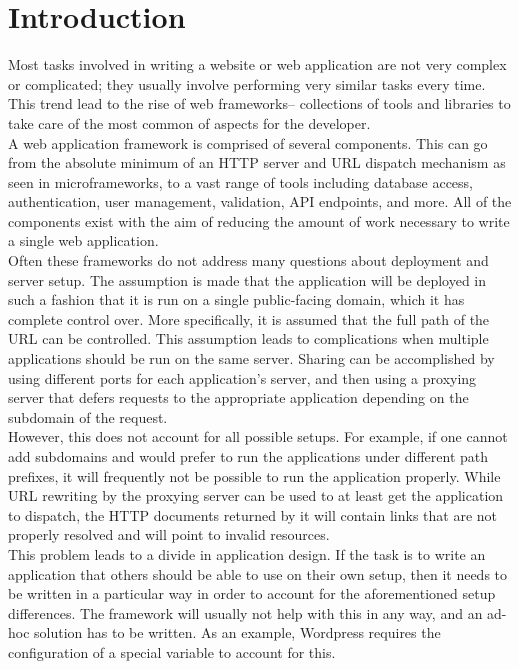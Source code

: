 \documentclass{sig-alternate}
\begin{document}
\printccsdesc


\section{Introduction}
Most tasks involved in writing a website or web application are not very complex or complicated; they usually involve performing very similar tasks every time. This trend lead to the rise of web frameworks-- collections of tools and libraries to take care of the most common of aspects for the developer. \\

A web application framework is comprised of several components. This can go from the absolute minimum of an HTTP server and URL dispatch mechanism as seen in microframeworks\cite{microframeworks}, to a vast range of tools including database access, authentication, user management, validation, API endpoints, and more. All of the components exist with the aim of reducing the amount of work necessary to write a single web application. \\

Often these frameworks do not address many questions about deployment and server setup. The assumption is made that the application will be deployed in such a fashion that it is run on a single public-facing domain, which it has complete control over. More specifically, it is assumed that the full path of the URL can be controlled. This assumption leads to complications when multiple applications should be run on the same server. Sharing can be accomplished by using different ports for each application's server, and then using a proxying server that defers requests to the appropriate application depending on the subdomain of the request. \\

However, this does not account for all possible setups. For example, if one cannot add subdomains and would prefer to run the applications under different path prefixes, it will frequently not be possible to run the application properly. While URL rewriting by the proxying server can be used to at least get the application to dispatch, the HTTP documents returned by it will contain links that are not properly resolved and will point to invalid resources. \\

This problem leads to a divide in application design. If the task is to write an application that others should be able to use on their own setup, then it needs to be written in a particular way in order to account for the aforementioned setup differences. The framework will usually not help with this in any way, and an ad-hoc solution has to be written. As an example, Wordpress requires the configuration of a special variable to account for this.\cite{wordpress} \\
\end{document}
